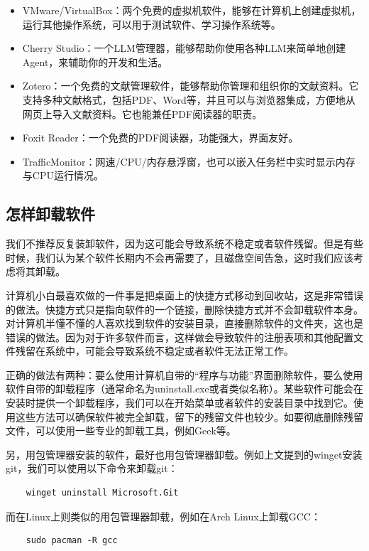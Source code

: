 \begin{itemize}
\begin{itemize}
      \item VMware/VirtualBox：两个免费的虚拟机软件，能够在计算机上创建虚拟机，运行其他操作系统，可以用于测试软件、学习操作系统等。
      \item Cherry Studio：一个LLM管理器，能够帮助你使用各种LLM来简单地创建Agent，来辅助你的开发和生活。
      \item Zotero：一个免费的文献管理软件，能够帮助你管理和组织你的文献资料。它支持多种文献格式，包括PDF、Word等，并且可以与浏览器集成，方便地从网页上导入文献资料。它也能兼任PDF阅读器的职责。
      \item Foxit Reader：一个免费的PDF阅读器，功能强大，界面友好。
      \item TrafficMonitor：网速/CPU/内存悬浮窗，也可以嵌入任务栏中实时显示内存与CPU运行情况。
    \end{itemize}
\end{itemize}

\subsection{怎样卸载软件}

我们不推荐反复装卸软件，因为这可能会导致系统不稳定或者软件残留。但是有些时候，我们认为某个软件长期内不会再需要了，且磁盘空间告急，这时我们应该考虑将其卸载。

计算机小白最喜欢做的一件事是把桌面上的快捷方式移动到回收站，这是非常错误的做法。快捷方式只是指向软件的一个链接，删除快捷方式并不会卸载软件本身。对计算机半懂不懂的人喜欢找到软件的安装目录，直接删除软件的文件夹，这也是错误的做法。因为对于许多软件而言，这样做会导致软件的注册表项和其他配置文件残留在系统中，可能会导致系统不稳定或者软件无法正常工作。

正确的做法有两种：要么使用计算机自带的“程序与功能”界面删除软件，要么使用软件自带的卸载程序（通常命名为uninstall.exe或者类似名称）。某些软件可能会在安装时提供一个卸载程序，我们可以在开始菜单或者软件的安装目录中找到它。使用这些方法可以确保软件被完全卸载，留下的残留文件也较少。如要彻底删除残留文件，可以使用一些专业的卸载工具，例如Geek等。

另，用包管理器安装的软件，最好也用包管理器卸载。例如上文提到的winget安装git，我们可以使用以下命令来卸载git：
\begin{verbatim}
    winget uninstall Microsoft.Git
\end{verbatim}
而在Linux上则类似的用包管理器卸载，例如在Arch Linux上卸载GCC：
\begin{verbatim}
    sudo pacman -R gcc
\end{verbatim}

